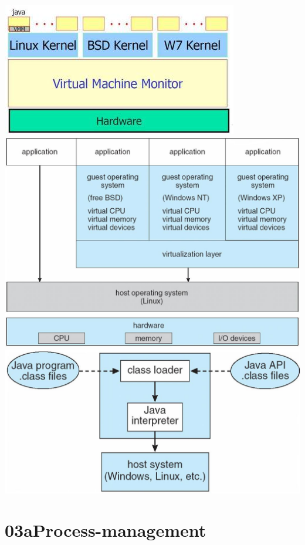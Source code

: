 \documentclass[a4paper]{scrreprt}
\begin{document}
	\begin{center}
		\includegraphics[scale=0.5] {virtualmachine.png}
		\\
		\includegraphics[scale=0.35] {vmwarearchi.png}
		\\
		\includegraphics[scale=0.3] {javavm.png}
	\end{center}


\chapter{03aProcess-management}
\end{document}
